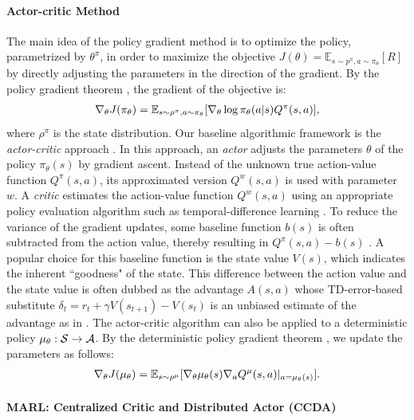 \documentclass{article} %
\newcommand{\myparagraph}[1]{\vspace{-0.25cm} \paragraph{#1}}
\begin{document}
\myparagraph{Actor-critic Method}
The main idea of the policy gradient method is to optimize the policy,
parametrized by $\theta^\pi$, in order to maximize the objective
$J(\theta) = \mathbb{E}_{s\sim p^\pi,a\sim \pi_\theta}[R]$ by directly
adjusting the parameters in the direction of the gradient. By the policy
gradient theorem \cite{sutton2000policy}, the gradient of the objective is:
\begin{align}
  \label{eq:pg}
\nabla _\theta J(\pi_\theta) = \mathbb{E}_{s\sim \rho^\pi,a\sim \pi_\theta}[\nabla _\theta \log \pi_\theta(a|s)Q^\pi(s, a)],
\end{align}
where $\rho^\pi$ is the state distribution.  Our baseline algorithmic framework is the {\em actor-critic} approach \cite{konda2003}. In this approach, an {\em actor} adjusts the parameters $\theta$ of the policy $\pi_\theta(s)$ by gradient ascent. Instead of the unknown true
action-value function $Q^\pi(s,a)$, its approximated version 
$Q^w(s,a)$ is used with parameter $w$. A {\em critic}
estimates the action-value function $Q^w(s,a)$ using an appropriate
policy evaluation algorithm such as temporal-difference learning \cite{tesauro1995temporal}. To reduce the variance of the gradient updates, some baseline function $b(s)$ is often subtracted from the action value, thereby resulting in $Q^\pi(s,a) - b(s)$ \cite{sutton1998}. A popular choice for this baseline function is the state value $V(s)$, which indicates the inherent ``goodness" of the state. This difference between the action value and the state value is often dubbed as the advantage $A(s,a)$ whose TD-error-based substitute $\delta_t=r_t+\gamma V(s_{t+1})-V(s_t)$ is an unbiased estimate of the advantage as in \cite{mnih2016a3c}. The actor-critic algorithm can also be applied to
a deterministic policy $\mu_\theta : {\cal S} \rightarrow {\cal A}$. By the deterministic policy gradient theorem \cite{dpg}, we update
the parameters as follows: 
\begin{align}
\label{eq:dpg}
  \nabla _\theta J(\mu_\theta) = \mathbb{E}_{s\sim
  \rho^\mu}[\nabla _\theta \mu_\theta(s)\nabla _aQ^\mu(s,
  a)|_{a=\mu_\theta (s)}].
\end{align}

\myparagraph{MARL: Centralized Critic and Distributed Actor (CCDA)}
\end{document}
